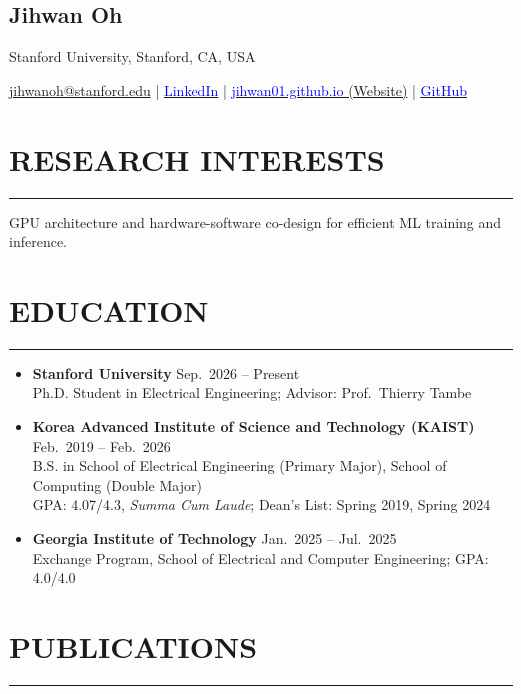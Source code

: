 \documentclass[11pt, a4paper]{article}
\newcommand{\name}[1]{
    \begin{center}
    \section*{\huge #1}
    \end{center}
}
\newcommand{\topinfo}[1]{
    \begin{center}
    \vspace{-0.2cm}#1
    \vspace{-0.1cm}
    \end{center}
}
\newcommand{\resumesection}[1]{
    \vspace{-0.35cm}
    \section*{#1}
    \vspace{-0.25cm}
    \hrule\vspace{0.2cm}
}
\begin{document}
\name{Jihwan Oh}

\onehalfspacing
\topinfo{Stanford University, Stanford, CA, USA}

\onehalfspacing
\topinfo{
\href{mailto:jihwanoh@stanford.edu}{jihwanoh@stanford.edu}
\; | \;
\href{https://www.linkedin.com/in/jihwan-oh-21a772305}{
\underline{\textcolor{blue}{LinkedIn}}}
\; | \;
\href{https://jihwan01.github.io/}{
\underline{\textcolor{blue}{jihwan01.github.io}} (Website)}
\; | \;
\href{https://github.com/jihwan01}{
\underline{\textcolor{blue}{GitHub}}}
}



\resumesection{RESEARCH INTERESTS}

GPU architecture and hardware-software co-design for efficient ML training and inference.

\resumesection{EDUCATION}

\begin{itemize}[leftmargin=1.2em]
    \item \textbf{Stanford University}
    \hfill Sep.\ 2026 -- Present\\[-0.2em]
    {\smaller[0.6] Ph.D. Student in Electrical Engineering; Advisor: Prof.\ Thierry Tambe}
\end{itemize}

\begin{itemize}[leftmargin=1.2em]
    \item \textbf{Korea Advanced Institute of Science and Technology (KAIST)}
    \hfill Feb.\ 2019 -- Feb.\ 2026\\[-0.2em]
    {\smaller[0.6] B.S. in School of Electrical Engineering (Primary Major), School of Computing (Double Major)}\\[-0.2em]
    {\smaller[0.6] GPA: 4.07/4.3, \textit{Summa Cum Laude}; Dean's List: Spring 2019, Spring 2024}
\end{itemize}

\begin{itemize}[leftmargin=1.2em]
    \item \textbf{Georgia Institute of Technology}
    \hfill Jan.\ 2025 -- Jul.\ 2025\\[-0.2em]
    {\smaller[0.6] Exchange Program, School of Electrical and Computer Engineering; GPA: 4.0/4.0}
\end{itemize}


\resumesection{PUBLICATIONS}
\end{document}
